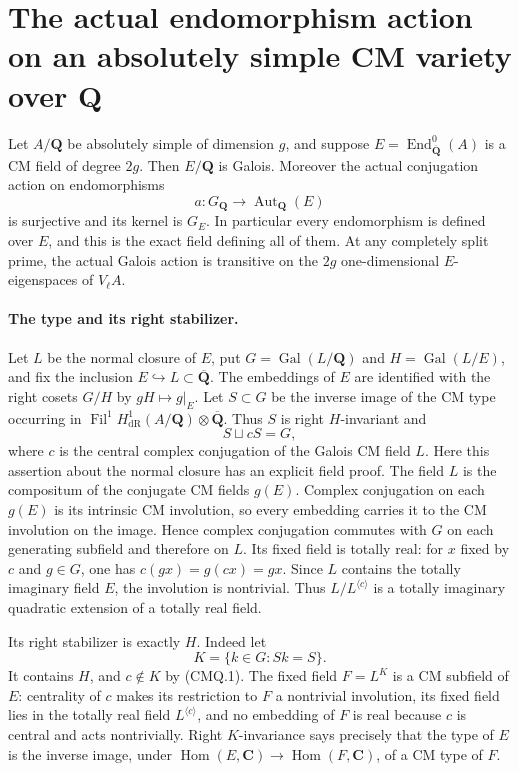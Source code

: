\section*{The actual endomorphism action on an absolutely simple CM variety over Q}

Let $A/\mathbf Q$ be absolutely simple of dimension $g$, and
suppose $E=\operatorname{End}^0_{\overline{\mathbf Q}}(A)$
is a CM field of degree $2g$. Then $E/\mathbf Q$ is Galois.
Moreover the actual conjugation action on endomorphisms
\[
       a:G_{\mathbf Q}\longrightarrow
                         \operatorname{Aut}_{\mathbf Q}(E)
\]
is surjective and its kernel is $G_E$. In particular every
endomorphism is defined over $E$, and this is the exact
field defining all of them. At any completely split prime,
the actual Galois action is transitive on the $2g$
one-dimensional $E$-eigenspaces of $V_\ell A$.

\paragraph{The type and its right stabilizer.}
Let $L$ be the normal closure of $E$, put
$G=\operatorname{Gal}(L/\mathbf Q)$ and
$H=\operatorname{Gal}(L/E)$, and fix the inclusion
$E\hookrightarrow L\subset\overline{\mathbf Q}$.
The embeddings of $E$ are identified with the right
cosets $G/H$ by $gH\mapsto g|_E$. Let $S\subset G$
be the inverse image of the CM type occurring in
$\operatorname{Fil}^1H^1_{\mathrm{dR}}(A/\mathbf Q)
\otimes\overline{\mathbf Q}$. Thus $S$ is right
$H$-invariant and
\[
                           S\sqcup cS=G,                  \tag{CMQ.1}
\]
where $c$ is the central complex conjugation of the
Galois CM field $L$. Here this assertion about the normal
closure has an explicit field proof. The field $L$ is
the compositum of the conjugate CM fields $g(E)$.
Complex conjugation on each $g(E)$ is its intrinsic
CM involution, so every embedding carries it to the
CM involution on the image. Hence complex conjugation
commutes with $G$ on each generating subfield and
therefore on $L$. Its fixed field is totally real:
for $x$ fixed by $c$ and $g\in G$, one has
$c(gx)=g(cx)=gx$. Since $L$ contains the totally
imaginary field $E$, the involution is nontrivial.
Thus $L/L^{\langle c\rangle}$ is a totally
imaginary quadratic extension of a totally real field.

Its right stabilizer is exactly $H$. Indeed let
\[
                    K=\{k\in G:Sk=S\}.
\]
It contains $H$, and $c\notin K$ by (CMQ.1).
The fixed field $F=L^K$ is a CM subfield of $E$:
centrality of $c$ makes its restriction to $F$ a
nontrivial involution, its fixed field lies in the
totally real field $L^{\langle c\rangle}$, and no
embedding of $F$ is real because $c$ is central and
acts nontrivially. Right $K$-invariance says precisely
that the type of $E$ is the inverse image, under
$\operatorname{Hom}(E,\mathbf C)\to
 \operatorname{Hom}(F,\mathbf C)$, of a CM type of $F$.

